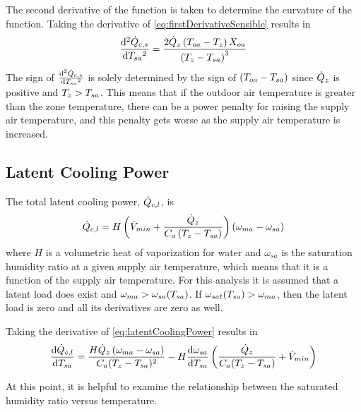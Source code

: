 The second derivative of the function is taken to determine the
curvature of the function. Taking the derivative of 
\ref{eq:firstDerivativeSensible} results in
\begin{equation}
    \dv[2]{\dot{Q}_{c,s}}{T_{sa}{}} = \frac{2 \dot{Q}_{z}
    \left(T_{oa}-T_z\right) X_{oa} }{\left(T_z-T_{sa}{}\right)^3}
\end{equation}
The sign of \(\dv[2]{\dot{Q}_{c,s}}{T_{sa}{}}\) is solely determined by
the sign of \((T_{oa}{}-T_{sa}{})\) since \(\dot{Q}_{z}\) is positive
and \(T_z > T_{sa}{} \). This means that if the outdoor air temperature is
greater than the zone temperature, there can be a power penalty for
raising the supply air temperature, and this penalty gets worse as the
supply air temperature is increased.  


\subsection{Latent Cooling Power}

The total latent cooling power, \(\dot{Q}_{c,l}\), is 
\begin{equation}\label{eq:latentCoolingPower}
   \dot{Q}_{c,l} = H \left(\dot{V}_{min} + \frac{\dot{Q}_{z}}{C_{a}\left(T_{z}-T_{sa}{}\right)} \right) \left( \omega_{ma} -
   \omega_{sa} \right) 
\end{equation}
where \(H\) is a volumetric heat of vaporization for water and \(\omega_{sa}\)
is the saturation humidity ratio at a given supply air temperature, which means
that it is a function of the supply air temperature.  For this analysis it is
assumed that a latent load does exist and \(\omega_{ma} >
\omega_{sa}(T_{sa}{})\). If \(\omega_{sat}(T_{sa}{}) > \omega_{ma}\), then
the latent load is zero and all its derivatives are zero as well.

Taking the derivative of  \ref{eq:latentCoolingPower} results in
\begin{equation}\label{eq:firstDerivativeLatentPower}
    \dv{\dot{Q}_{c,l}}{T_{sa}{}} = \frac{H \dot{Q}_{z} \left(\omega_{ma} -\omega_{sa} \right)}{C_{a} (T_{z}-T_{sa}{})^2} 
    -H \dv{\omega_{sa}}{T_{sa}{}} \left(\frac{\dot{Q}_{z}}{C_{a} (T_{z}-T_{sa}{})}+\dot{V}_{min}\right) 
\end{equation}

At this point, it is helpful to examine the relationship between the
saturated humidity ratio versus temperature. 

